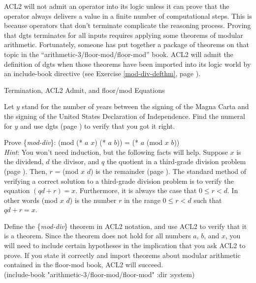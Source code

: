 \begin{aside}
ACL2 will not admit an operator into its logic unless
it can prove that the operator always delivers a value in
a finite number of computational steps.
This is because operators that don't terminate complicate the reasoning process.
Proving that dgts terminates for all inputs
requires applying some theorems of modular arithmetic.
Fortunately, someone has put together a package of theorems on that topic
in the
``arithmetic-3/floor-mod/floor-mod'' book.
ACL2 will admit the definition of dgts when those theorems
have been imported into its logic world by an include-book directive
(see Exercise \ref{mod-div-defthm}, page \pageref{mod-div-defthm}).
\caption{Termination, ACL2 Admit, and floor/mod Equations}
\label{admit-def}
\label{floor-mod-book}
\end{aside}

\begin{ExerciseList}
\Exercise Let $y$ stand for the number of years
between the signing of the Magna Carta and
the signing of the United States Declaration of Independence.
Find the numeral for $y$ and use dgts (page \pageref{dgts-defun})
to verify that you got it right.


\Exercise \label{modular-division}
Prove \{\emph{mod-div}\}:
(mod (* $a$ $x$) (* $a$ $b$)) = (* $a$ (mod $x$ $b$)) \\
\emph{Hint}: You won't need induction, but the following facts will help.
Suppose $x$ is the dividend, $d$ the divisor, and $q$ the quotient
in a third-grade division problem (page \pageref{third-grade-division}).
Then, $r$ = (mod $x$ $d$) is the remainder (page \pageref{mod-function}).
The standard method of verifying a correct solution to a
third-grade division problem is to verify the equation
$(qd + r) = x$. Furthermore, it is always the case
that $0 \le r < d$. In other words (mod $x$ $d$) is the number $r$
in the range $0 \le r < d$ such that $qd + r = x$.

\Exercise \label{mod-div-defthm}
Define the \{\emph{mod-div}\} theorem
in ACL2 notation, and use ACL2 to verify that it is a theorem.
Since the theorem does not hold for all numbers $a$, $b$, and $x$,
you will need to include certain hypotheses in the implication
that you ask ACL2 to prove. If you state it correctly and import
theorems about modular arithmetic contained in the floor-mod book,
ACL2 will succeed.\\

\label{floor-mod-include-book}
\phantom{x}\hspace{2em}(include-book "arithmetic-3/floor-mod/floor-mod" :dir :system)
\end{ExerciseList}

